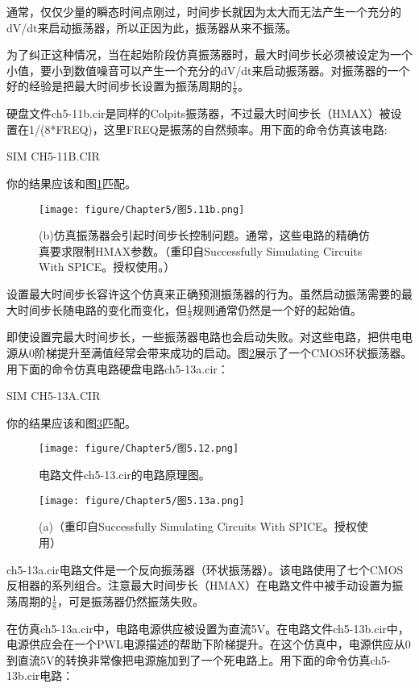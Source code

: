 通常，仅仅少量的瞬态时间点刚过，时间步长就因为太大而无法产生一个充分的dV/dt来启动振荡器，所以正因为此，振荡器从来不振荡。

为了纠正这种情况，当在起始阶段仿真振荡器时，最大时间步长必须被设定为一个小值，要小到数值噪音可以产生一个充分的dV/dt来启动振荡器。对振荡器的一个好的经验是把最大时间步长设置为振荡周期的$\frac{1}{8}$。

硬盘文件ch5-11b.cir是同样的Colpits振荡器，不过最大时间步长（HMAX）被设置在1/(8*FREQ)，这里FREQ是振荡的自然频率。用下面的命令仿真该电路:

SIM CH5-11B.CIR

你的结果应该和图\ref{图5.11b}匹配。

\begin{figure}[htbp]
\small
    \centering
    \texttt{[image: figure/Chapter5/图5.11b.png]}
    \caption{(b)仿真振荡器会引起时间步长控制问题。通常，这些电路的精确仿真要求限制HMAX参数。（重印自Successfully Simulating Circuits With SPICE。授权使用。）}
    \label{图5.11b}
\end{figure}

设置最大时间步长容许这个仿真来正确预测振荡器的行为。虽然启动振荡需要的最大时间步长随电路的变化而变化，但$\frac{1}{8}$规则通常仍然是一个好的起始值。

即使设置完最大时间步长，一些振荡器电路也会启动失败。对这些电路，把供电电源从0阶梯提升至满值经常会带来成功的启动。图\ref{图5.12}展示了一个CMOS环状振荡器。用下面的命令仿真电路硬盘电路ch5-13a.cir：

SIM CH5-13A.CIR

你的结果应该和图\ref{图5.13a}匹配。

\begin{figure}[htbp]
\small
    \centering
    \texttt{[image: figure/Chapter5/图5.12.png]}
    \caption{电路文件ch5-13.cir的电路原理图。}
    \label{图5.12}
\end{figure}

\begin{figure}[htbp]
\small
    \centering
    \texttt{[image: figure/Chapter5/图5.13a.png]}
    \caption{(a)（重印自Successfully Simulating Circuits With SPICE。授权使用）}
    \label{图5.13a}
\end{figure}

ch5-13a.cir电路文件是一个反向振荡器（环状振荡器）。该电路使用了七个CMOS反相器的系列组合。注意最大时间步长（HMAX）在电路文件中被手动设置为振荡周期的$\frac{1}{8}$，可是振荡器仍然振荡失败。

在仿真ch5-13a.cir中，电路电源供应被设置为直流5V。在电路文件ch5-13b.cir中，电源供应会在一个PWL电源描述的帮助下阶梯提升。在这个仿真中，电源供应从0到直流5V的转换非常像把电源施加到了一个死电路上。用下面的命令仿真ch5-13b.cir电路：


